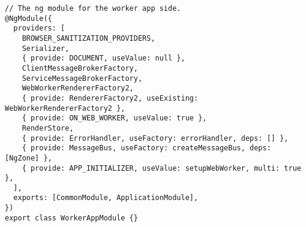 \begin{verbatim}
// The ng module for the worker app side.
@NgModule({
  providers: [
    BROWSER_SANITIZATION_PROVIDERS,
    Serializer,
    { provide: DOCUMENT, useValue: null },
    ClientMessageBrokerFactory,
    ServiceMessageBrokerFactory,
    WebWorkerRendererFactory2,
    { provide: RendererFactory2, useExisting: WebWorkerRendererFactory2 },
    { provide: ON_WEB_WORKER, useValue: true },
    RenderStore,
    { provide: ErrorHandler, useFactory: errorHandler, deps: [] },
    { provide: MessageBus, useFactory: createMessageBus, deps: [NgZone] },
    { provide: APP_INITIALIZER, useValue: setupWebWorker, multi: true },
  ],
  exports: [CommonModule, ApplicationModule],
})
export class WorkerAppModule {}
\end{verbatim}
